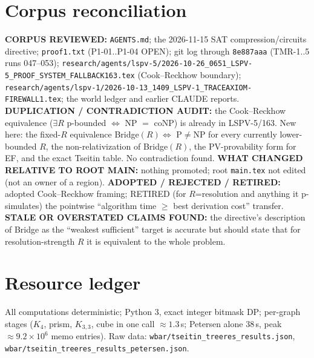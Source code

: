 \documentclass[11pt]{article}
\theoremstyle{remark}
\begin{document}
\section{Corpus reconciliation}
\textbf{CORPUS REVIEWED:} \texttt{AGENTS.md}; the 2026-11-15 SAT compression/circuits directive;
\texttt{proof1.txt} (P1-01..P1-04 OPEN); git log through \texttt{8e887aaa} (TMR-1..5 runs 047--053);
\texttt{research/agents/lspv-5/2026-10-26\_0651\_LSPV-5\_PROOF\_SYSTEM\_FALLBACK163.tex}
(Cook--Reckhow boundary); \texttt{research/agents/lspv-1/2026-10-13\_1409\_LSPV-1\_TRACEAXIOM-FIREWALL1.tex};
the world ledger and earlier CLAUDE reports.
\textbf{DUPLICATION / CONTRADICTION AUDIT:} the Cook--Reckhow equivalence
($\exists R$ p-bounded $\iff$ NP $=$ coNP) is already in LSPV-5/163. New here: the fixed-$R$
equivalence Bridge$(R)\iff$ P$\neq$NP for every currently lower-bounded $R$, the
non-relativization of Bridge$(R)$, the PV-provability form for EF, and the exact Tseitin table.
No contradiction found.
\textbf{WHAT CHANGED RELATIVE TO ROOT MAIN:} nothing promoted; root \texttt{main.tex} not edited
(not an owner of a region).
\textbf{ADOPTED / REJECTED / RETIRED:} adopted Cook--Reckhow framing; RETIRED (for $R$=resolution
and anything it p-simulates) the pointwise ``algorithm time $\ge$ best derivation cost'' transfer.
\textbf{STALE OR OVERSTATED CLAIMS FOUND:} the directive's description of Bridge as the
``weakest sufficient'' target is accurate but should state that for resolution-strength $R$
it is equivalent to the whole problem.

\section{Resource ledger}
All computations deterministic; Python 3, exact integer bitmask DP; per-graph stages
($K_4$, prism, $K_{3,3}$, cube in one call $\approx1.3$\,s; Petersen alone 38\,s, peak
$\approx9.2\times10^6$ memo entries). Raw data: \texttt{wbar/tseitin\_treeres\_results.json},
\texttt{wbar/tseitin\_treeres\_results\_petersen.json}.
\end{document}
